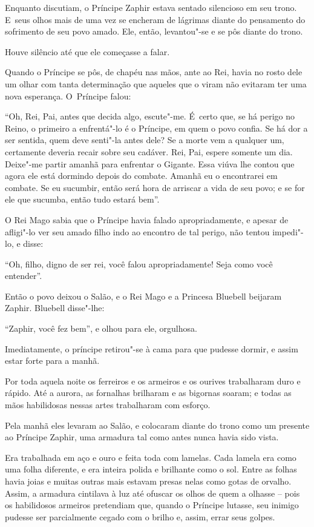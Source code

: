 Enquanto discutiam, o Príncipe Zaphir estava sentado silencioso em seu
trono. E~seus olhos mais de uma vez se encheram de lágrimas diante do
pensamento do sofrimento de seu povo amado. Ele, então, levantou"-se e se
pôs diante do trono.

Houve silêncio até que ele começasse a falar.

Quando o Príncipe se pôs, de chapéu nas mãos, ante ao Rei, havia no
rosto dele um olhar com tanta determinação que aqueles que o viram não
evitaram ter uma nova esperança. O~Príncipe falou:

``Oh, Rei, Pai, antes que decida algo, escute"-me. É~certo que, se há
perigo no Reino, o primeiro a enfrentá"-lo é o Príncipe, em quem o povo
confia. Se há dor a ser sentida, quem deve senti"-la antes dele? Se a
morte vem a qualquer um, certamente deveria recair sobre seu cadáver.
Rei, Pai, espere somente um dia. Deixe"-me partir amanhã para enfrentar o
Gigante. Essa viúva lhe contou que agora ele está dormindo depois do
combate. Amanhã eu o encontrarei em combate. Se eu sucumbir, então será
hora de arriscar a vida de seu povo; e se for ele que sucumba, então
tudo estará bem''.



O Rei Mago sabia que o Príncipe havia falado apropriadamente, e apesar
de afligi"-lo ver seu amado filho indo ao encontro de tal perigo, não
tentou impedi"-lo, e disse:

``Oh, filho, digno de ser rei, você falou apropriadamente! Seja como
você entender''.

Então o povo deixou o Salão, e o Rei Mago e a Princesa Bluebell beijaram
Zaphir. Bluebell disse"-lhe:

``Zaphir, você fez bem'', e olhou para ele, orgulhosa.

Imediatamente, o príncipe retirou"-se à cama para que pudesse dormir, e
assim estar forte para a manhã.

Por toda aquela noite os ferreiros e os armeiros e os ourives
trabalharam duro e rápido. Até a aurora, as fornalhas brilharam e as
bigornas soaram; e todas as mãos habilidosas nessas artes trabalharam
com esforço.

Pela manhã eles levaram ao Salão, e colocaram diante do trono como um
presente ao Príncipe Zaphir, uma armadura tal como antes nunca havia
sido vista.

Era trabalhada em aço e ouro e feita toda com lamelas. Cada lamela era
como uma folha diferente, e era inteira polida e brilhante como o sol.
Entre as folhas havia joias e muitas outras mais estavam presas nelas
como gotas de orvalho. Assim, a armadura cintilava à luz até ofuscar os
olhos de quem a olhasse -- pois os habilidosos armeiros pretendiam que,
quando o Príncipe lutasse, seu inimigo pudesse ser parcialmente cegado
com o brilho e, assim, errar seus golpes.

